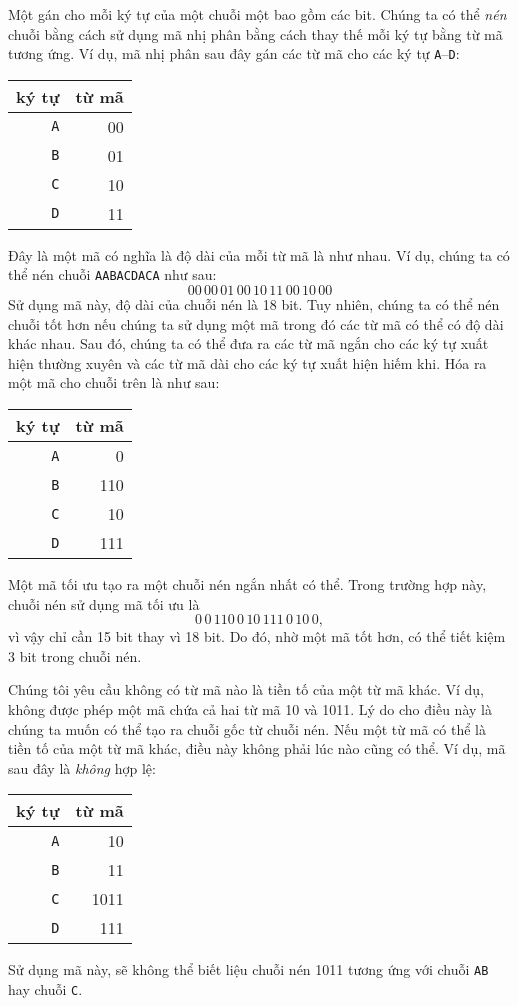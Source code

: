 
Một  gán cho mỗi ký tự
của một chuỗi một  bao gồm các bit.
Chúng ta có thể \emph{nén} chuỗi bằng cách sử dụng mã nhị phân
bằng cách thay thế mỗi ký tự bằng
từ mã tương ứng.
Ví dụ, mã nhị phân sau đây
gán các từ mã cho các ký tự
\texttt{A}–\texttt{D}:
\begin{center}
\begin{tabular}{rr}
ký tự & từ mã \\
\hline
\texttt{A} & 00 \\
\texttt{B} & 01 \\
\texttt{C} & 10 \\
\texttt{D} & 11 \\
\end{tabular}
\end{center}
Đây là một mã 
có nghĩa là độ dài của mỗi
từ mã là như nhau.
Ví dụ, chúng ta có thể nén chuỗi
\texttt{AABACDACA} như sau:
\[00\,00\,01\,00\,10\,11\,00\,10\,00\]
Sử dụng mã này, độ dài của chuỗi nén
là 18 bit.
Tuy nhiên, chúng ta có thể nén chuỗi tốt hơn
nếu chúng ta sử dụng một mã 
trong đó các từ mã có thể có độ dài khác nhau.
Sau đó, chúng ta có thể đưa ra các từ mã ngắn cho
các ký tự xuất hiện thường xuyên
và các từ mã dài cho các ký tự
xuất hiện hiếm khi.
Hóa ra một mã 
cho chuỗi trên là như sau:
\begin{center}
\begin{tabular}{rr}
ký tự & từ mã \\
\hline
\texttt{A} & 0 \\
\texttt{B} & 110 \\
\texttt{C} & 10 \\
\texttt{D} & 111 \\
\end{tabular}
\end{center}
Một mã tối ưu tạo ra một chuỗi nén
ngắn nhất có thể.
Trong trường hợp này, chuỗi nén sử dụng
mã tối ưu là
\[0\,0\,110\,0\,10\,111\,0\,10\,0,\]
vì vậy chỉ cần 15 bit thay vì 18 bit.
Do đó, nhờ một mã tốt hơn, có thể
tiết kiệm 3 bit trong chuỗi nén.

Chúng tôi yêu cầu không có từ mã nào
là tiền tố của một từ mã khác.
Ví dụ, không được phép một mã
chứa cả hai từ mã 10
và 1011.
Lý do cho điều này là chúng ta muốn
có thể tạo ra chuỗi gốc
từ chuỗi nén.
Nếu một từ mã có thể là tiền tố của một từ mã khác,
điều này không phải lúc nào cũng có thể.
Ví dụ, mã sau đây là \emph{không} hợp lệ:
\begin{center}
\begin{tabular}{rr}
ký tự & từ mã \\
\hline
\texttt{A} & 10 \\
\texttt{B} & 11 \\
\texttt{C} & 1011 \\
\texttt{D} & 111 \\
\end{tabular}
\end{center}
Sử dụng mã này, sẽ không thể biết
liệu chuỗi nén 1011 tương ứng với
chuỗi \texttt{AB} hay chuỗi \texttt{C}.

